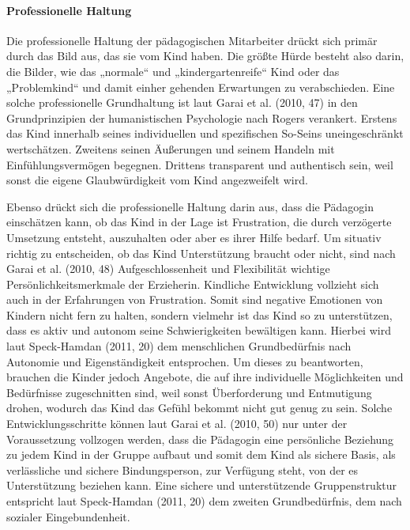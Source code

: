 \paragraph{Professionelle Haltung} 
Die professionelle Haltung der pädagogischen Mitarbeiter drückt sich primär durch das Bild aus, das sie vom Kind haben.
Die größte Hürde besteht also darin, die Bilder, wie das „normale“ und „kindergartenreife“ Kind oder das „Problemkind“ und damit einher gehenden Erwartungen zu verabschieden.  
Eine solche professionelle Grundhaltung ist laut Garai et al. (2010, 47) in den Grundprinzipien der humanistischen Psychologie nach Rogers verankert. Erstens das Kind innerhalb seines individuellen und spezifischen So-Seins uneingeschränkt wertschätzen. Zweitens seinen Äußerungen und seinem Handeln mit Einfühlungsvermögen begegnen. Drittens transparent und authentisch sein, weil sonst die eigene Glaubwürdigkeit vom Kind angezweifelt wird.
   
Ebenso drückt sich die professionelle Haltung darin aus, dass die Pädagogin einschätzen kann, ob das Kind in der Lage ist Frustration, die durch verzögerte Umsetzung entsteht, auszuhalten oder aber es ihrer Hilfe bedarf. Um situativ richtig zu entscheiden, ob das Kind Unterstützung braucht oder nicht, sind nach Garai et al. (2010, 48) Aufgeschlossenheit und Flexibilität wichtige Persönlichkeitsmerkmale der Erzieherin. Kindliche Entwicklung vollzieht sich auch in der Erfahrungen von Frustration. Somit sind negative Emotionen von Kindern nicht fern zu halten, sondern vielmehr ist das Kind so zu unterstützen, dass es aktiv und autonom seine Schwierigkeiten bewältigen kann.
Hierbei wird laut Speck-Hamdan (2011, 20) dem menschlichen Grundbedürfnis nach Autonomie und Eigenständigkeit entsprochen. Um dieses zu beantworten, brauchen die Kinder jedoch Angebote, die auf ihre individuelle Möglichkeiten und Bedürfnisse zugeschnitten sind, weil sonst Überforderung und Entmutigung drohen, wodurch das Kind das Gefühl bekommt nicht gut genug zu sein. Solche Entwicklungsschritte können laut Garai et al. (2010, 50) nur unter der Voraussetzung vollzogen werden, dass die Pädagogin eine persönliche Beziehung zu jedem Kind in der Gruppe aufbaut und somit dem Kind als sichere Basis, als verlässliche und sichere Bindungsperson, zur Verfügung steht, von der es Unterstützung beziehen kann. Eine sichere und unterstützende Gruppenstruktur entspricht laut Speck-Hamdan (2011, 20) dem zweiten Grundbedürfnis, dem nach sozialer Eingebundenheit. 
   
